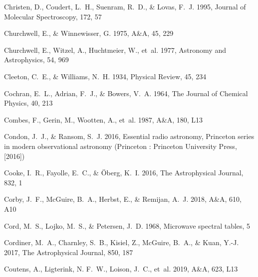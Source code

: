 \documentclass[twocolumn]{aastex631}
\begin{document}
\begin{thebibliography}{}
Christen, D., Coudert, L.~H., Suenram, R.~D., \& Lovas, F.~J. 1995, Journal of
  Molecular Spectroscopy, 172, 57

Churchwell, E., \& Winnewisser, G. 1975, A{\&}A, 45, 229

{Churchwell}, E., {Witzel}, A., {Huchtmeier}, W., {et~al.} 1977, Astronomy and
  Astrophysics, 54, 969

Cleeton, C.~E., \& Williams, N.~H. 1934, Physical Review, 45, 234

Cochran, E.~L., Adrian, F.~J., \& Bowers, V.~A. 1964, The Journal of Chemical
  Physics, 40, 213

Combes, F., Gerin, M., Wootten, A., {et~al.} 1987, A{\&}A, 180, L13

Condon, J.~J., \& Ransom, S.~J. 2016, {Essential radio astronomy}, Princeton
  series in modern observational astronomy (Princeton : Princeton University
  Press, [2016])

Cooke, I.~R., Fayolle, E.~C., \& {\"O}berg, K.~I. 2016, The Astrophysical
  Journal, 832, 1

Corby, J.~F., McGuire, B.~A., Herbst, E., \& Remijan, A.~J. 2018, A{\&}A, 610,
  A10

Cord, M.~S., Lojko, M.~S., \& Petersen, J.~D. 1968, Microwave spectral tables,
  5

Cordiner, M.~A., Charnley, S.~B., Kisiel, Z., McGuire, B.~A., \& Kuan, Y.-J.
  2017, The Astrophysical Journal, 850, 187

Coutens, A., Ligterink, N. F.~W., Loison, J.~C., {et~al.} 2019, A{\&}A, 623,
  L13


\end{thebibliography}
\end{document}
